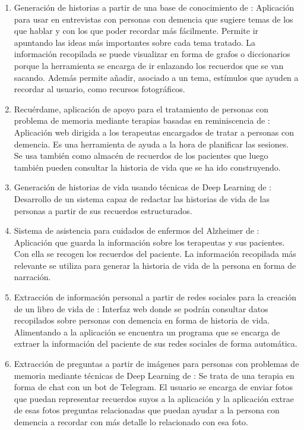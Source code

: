 \begin{enumerate}
	\item Generación de historias a partir de una base de conocimiento de \cite{lcastilla}: Aplicación para usar en entrevistas con personas con demencia que sugiere temas de los que hablar y con los que poder recordar más fácilmente. Permite ir apuntando las ideas más importantes sobre cada tema tratado. La información recopilada se puede visualizar en forma de grafos o diccionarios porque la herramienta se encarga de ir enlazando los recuerdos que se van sacando. Además permite añadir, asociado a un tema, estímulos que ayuden a recordar al usuario, como recursos fotográficos. 
	\item Recuérdame, aplicación de apoyo para el tratamiento de personas con problema de memoria mediante terapias basadas en reminiscencia de \cite{cbarquilla}: Aplicación web dirigida a los terapeutas encargados de tratar a personas con demencia. Es una herramienta de ayuda a la hora de planificar las sesiones. Se usa también como almacén de recuerdos de los pacientes que luego también pueden consultar la historia de vida que se ha ido construyendo. 
	\item Generación de historias de vida usando técnicas de Deep Learning de \cite{calameda}: Desarrollo de un sistema capaz de redactar las historias de vida de las personas a partir de sus recuerdos estructurados. 
	\item Sistema de asistencia para cuidados de enfermos del Alzheimer de \cite{dbedinger}: Aplicación que guarda la información sobre los terapeutas y sus pacientes. Con ella se recogen los recuerdos del paciente. La información recopilada más relevante se utiliza para generar la historia de vida de la persona en forma de narración. 
	\item Extracción de información personal a partir de redes sociales para la creación de un libro de vida de \cite{paguilera}: Interfaz web donde se podrán consultar datos recopilados sobre personas con demencia en forma de historia de vida. Alimentando a la aplicación se encuentra un programa que se encarga de extraer la información del paciente de sus redes sociales de forma automática.
	\item Extracción de preguntas a partir de imágenes para personas con problemas de memoria mediante técnicas de Deep Learning de \cite{aaizel} : Se trata de una terapia en forma de chat con un bot de Telegram. El usuario se encarga de enviar fotos que puedan representar recuerdos suyos a la aplicación y la aplicación extrae de esas fotos preguntas relacionadas que puedan ayudar a la persona con demencia a recordar con más detalle lo relacionado con esa foto. 

\end{enumerate}
